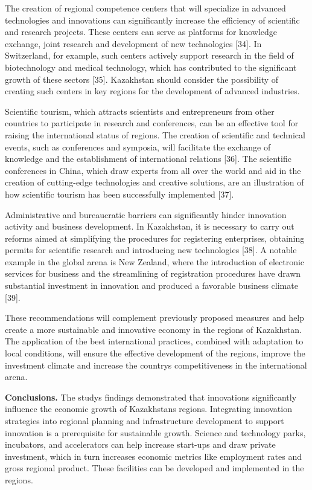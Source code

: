 The creation of regional competence centers that will specialize in
advanced technologies and innovations can significantly increase the
efficiency of scientific and research projects. These centers can serve
as platforms for knowledge exchange, joint research and development of
new technologies {[}34{]}. In Switzerland, for example, such centers
actively support research in the field of biotechnology and medical
technology, which has contributed to the significant growth of these
sectors {[}35{]}. Kazakhstan should consider the possibility of creating
such centers in key regions for the development of advanced industries.

Scientific tourism, which attracts scientists and entrepreneurs from
other countries to participate in research and conferences, can be an
effective tool for raising the international status of regions. The
creation of scientific and technical events, such as conferences and
symposia, will facilitate the exchange of knowledge and the
establishment of international relations {[}36{]}. The scientific
conferences in China, which draw experts from all over the world and aid
in the creation of cutting-edge technologies and creative solutions, are
an illustration of how scientific tourism has been successfully
implemented {[}37{]}.

Administrative and bureaucratic barriers can significantly hinder
innovation activity and business development. In Kazakhstan, it is
necessary to carry out reforms aimed at simplifying the procedures for
registering enterprises, obtaining permits for scientific research and
introducing new technologies {[}38{]}. A notable example in the global
arena is New Zealand, where the introduction of electronic services for
business and the streamlining of registration procedures have drawn
substantial investment in innovation and produced a favorable business
climate {[}39{]}.

These recommendations will complement previously proposed measures and
help create a more sustainable and innovative economy in the regions of
Kazakhstan. The application of the best international practices,
combined with adaptation to local conditions, will ensure the effective
development of the regions, improve the investment climate and increase
the country\textquotesingle s competitiveness in the international
arena.

{\bfseries Conclusions.} The study\textquotesingle s findings demonstrated
that innovations significantly influence the economic growth of
Kazakhstan\textquotesingle s regions. Integrating innovation strategies
into regional planning and infrastructure development to support
innovation is a prerequisite for sustainable growth. Science and
technology parks, incubators, and accelerators can help increase
start-ups and draw private investment, which in turn increases economic
metrics like employment rates and gross regional product. These
facilities can be developed and implemented in the regions.

